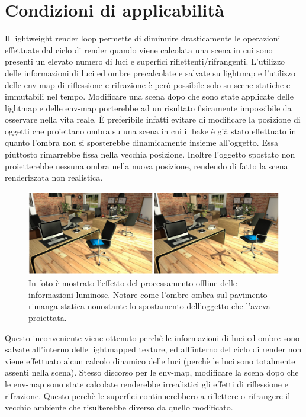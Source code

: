 \section{Condizioni di applicabilità}
\label{sec:chapter_lrl_cond_app}

Il lightweight render loop permette di diminuire drasticamente le operazioni effettuate dal ciclo di render quando viene calcolata una scena in cui sono presenti un elevato numero di luci e superfici riflettenti/rifrangenti. 
L’utilizzo delle informazioni di luci ed ombre precalcolate e salvate su lightmap e l’utilizzo delle env-map di riflessione e rifrazione è però possibile solo su scene statiche e immutabili nel tempo.
Modificare una scena dopo che sono state applicate delle lightmap e delle env-map porterebbe ad un risultato fisicamente impossibile da osservare nella vita reale. 
È preferibile infatti evitare di modificare la posizione di oggetti che proiettano ombra su una scena in cui il bake è già stato effettuato in quanto l’ombra non si sposterebbe dinamicamente insieme all’oggetto. Essa piuttosto rimarrebbe fissa nella vecchia posizione. 
Inoltre l’oggetto spostato non proietterebbe nessuna ombra nella nuova posizione, rendendo di fatto la scena renderizzata non realistica. 
\\
\begin{figure}[htb]
 \centering
 \includegraphics[width=1\linewidth]{images/chapter_lrl/lrl_appl1.png}\hfill
 \caption[Applicabilità, ombre statiche]{In foto è mostrato l'effetto del processamento offline delle informazioni luminose. Notare come l'ombre ombra sul pavimento rimanga statica nonostante lo spostamento dell'oggetto che l'aveva proiettata.}
 \label{fig:lrl_appl1}
\end{figure}
Questo inconveniente viene ottenuto perchè le informazioni di luci ed ombre sono salvate all’interno delle lightmapped texture, ed all’interno del ciclo di render non viene effettuato alcun calcolo dinamico delle luci  (perchè le luci sono totalmente assenti nella scena).
Stesso discorso per le env-map, modificare la scena dopo che le env-map sono state calcolate renderebbe irrealistici gli effetti di riflessione e rifrazione. Questo perchè le superfici continuerebbero a riflettere o rifrangere  il vecchio ambiente che risulterebbe diverso da quello modificato.

